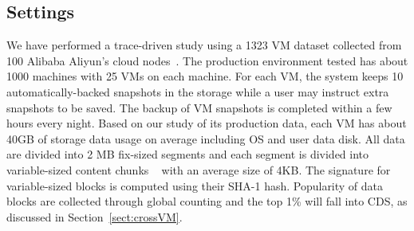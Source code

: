 \subsection{Settings}
We have performed a trace-driven study using  a 1323 VM dataset  collected from 
100 Alibaba Aliyun's cloud nodes~\cite{WeiZhangIEEE}.
The production environment tested has  about 1000 machines with 25 VMs on each machine.
For each VM, the system keeps 10 automatically-backed snapshots in the storage while
a user may instruct extra snapshots to be saved.
The backup of VM snapshots is completed within a few  hours every night.
Based on our study of its production  data,  each VM has about  40GB of storage  data usage on average
including OS and user data disk.
All data are divided into 2 MB fix-sized segments and each segment is divided into 
variable-sized content chunks ~\cite{similar94,rabin81} with an average size of 4KB.
The signature for variable-sized blocks is computed using their SHA-1 hash. 
Popularity of data blocks are collected through global counting 
and the top 1\% will fall into CDS, as discussed in Section~\ref{sect:crossVM}.



